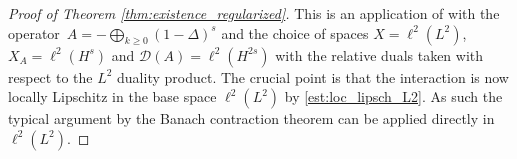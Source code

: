 \documentclass[12pt,a4paper]{amsart}
\numberwithin{equation}{section}
\newcommand{\ulphi}{\boldsymbol{\varphi}}
\begin{document}
	\begin{proof}[Proof of Theorem \ref{thm:existence_regularized}]
		This is an application of \cite[Theorem 3.3.1]{cazenave2003semilinear} with the operator~$ A = -\bigoplus_{k \geq 0} (1-\Delta)^s $ and the choice of spaces $ X = \ell^2(L^2) $, $ X_A = \ell^2(H^{s}) $ and $ \mathcal{D}(A) = \ell^2(H^{2s}) $ with the relative duals taken with respect to the $L^2$ duality product. 
		The crucial point is that the interaction is now locally Lipschitz in the base space $ \ell^2(L^2) $ by \eqref{est:loc_lipsch_L2}. As such the typical argument by the Banach contraction theorem can be applied directly in $ \ell^2(L^2) $. 
	\end{proof}
	
\end{document}
